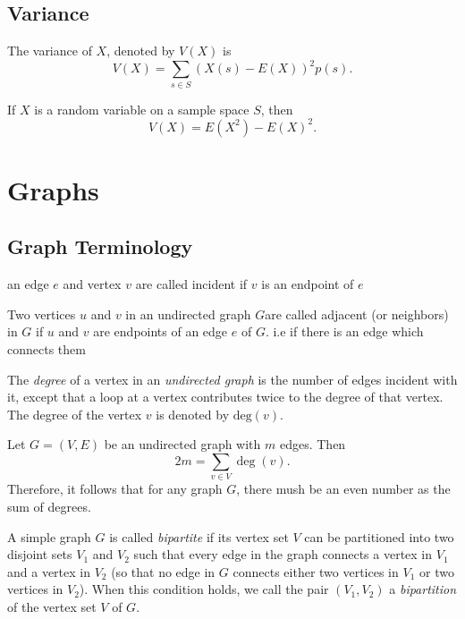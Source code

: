 \documentclass{article}
\begin{document}
\subsection{Variance}
\begin{definition}
    The variance of \( X \), denoted by \( V(X) \) is
    \[
    V(X) = \sum_{s \in S} (X(s) - E(X))^2 p(s).
    \]
\end{definition}
\begin{theorem}
    If \( X \) is a random variable on a sample space \( S \), then
    \[
    V(X) = E(X^2) - E(X)^2.
    \]
\end{theorem}
\section{Graphs}
\subsection{Graph Terminology}
\begin{definition}
    an edge \(e\) and vertex \(v\) are called incident if \(v\) is an endpoint of \(e\)
\end{definition}
\begin{definition}
    Two vertices \(u\) and \(v\) in an undirected graph \(G\)are called adjacent (or neighbors) in \(G\) if \(u\) and \(v\) are endpoints of an edge \(e\) of \(G\).
    i.e if there is an edge which connects them
\end{definition}
\begin{definition}
    The \textit{degree} of a vertex in an \textit{undirected graph} is the number of edges incident with it, except that a loop at a vertex contributes twice to the degree of that vertex. The degree of the vertex \( v \) is denoted by \( \text{deg}(v) \).
\end{definition}
\begin{theorem}
    Let \( G = (V, E) \) be an undirected graph with \( m \) edges. Then
    \[
    2m = \sum_{v \in V} \deg(v).
    \]
    Therefore, it follows that for any graph \(G\), there mush be an even number as the sum of degrees.
\end{theorem}
\begin{definition}
    A simple graph \( G \) is called \textit{bipartite} if its vertex set \( V \) can be partitioned into two disjoint sets \( V_1 \) and \( V_2 \) such that every edge in the graph connects a vertex in \( V_1 \) and a vertex in \( V_2 \) (so that no edge in \( G \) connects either two vertices in \( V_1 \) or two vertices in \( V_2 \)). When this condition holds, we call the pair \( (V_1, V_2) \) a \textit{bipartition} of the vertex set \( V \) of \( G \).
\end{definition}
\end{document}
